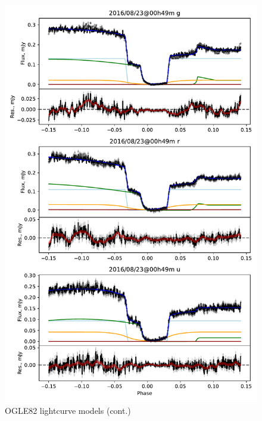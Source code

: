 \begin{figure}
    \centering
    \includegraphics[width=\textwidth]{figures/results/OGLE82/OGLE82_2.pdf}
    \caption{OGLE82 lightcurve models (cont.)}
    \label{fig:OGLE82 all lightcurves cont 1}
\end{figure}
